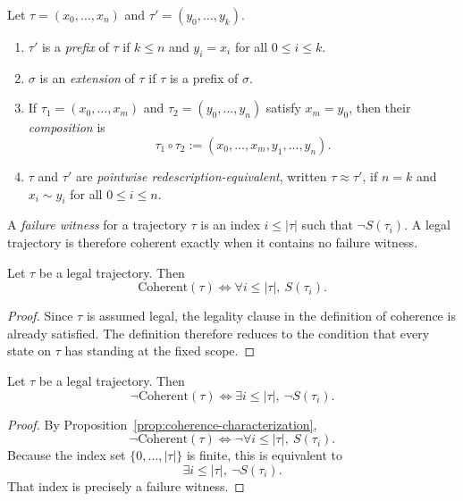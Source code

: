 \begin{definition}
Let $\tau=(x_0,\dots,x_n)$ and $\tau'=(y_0,\dots,y_k)$.
\begin{enumerate}
  \item $\tau'$ is a \emph{prefix} of $\tau$ if $k\le n$ and $y_i=x_i$ for all $0\le i\le k$.
  \item $\sigma$ is an \emph{extension} of $\tau$ if $\tau$ is a prefix of $\sigma$.
  \item If $\tau_1=(x_0,\dots,x_m)$ and $\tau_2=(y_0,\dots,y_n)$ satisfy $x_m=y_0$, then their \emph{composition} is
  \[
  \tau_1\circ \tau_2 := (x_0,\dots,x_m,y_1,\dots,y_n).
  \]
  \item $\tau$ and $\tau'$ are \emph{pointwise redescription-equivalent}, written $\tau \approx \tau'$, if $n=k$ and $x_i \sim y_i$ for all $0\le i\le n$.
\end{enumerate}
\end{definition}

\begin{definition}
A \emph{failure witness} for a trajectory $\tau$ is an index $i \le |\tau|$ such that $\neg S(\tau_i)$. A legal trajectory is therefore coherent exactly when it contains no failure witness.
\end{definition}

\begin{proposition}
\label{prop:coherence-characterization}
Let $\tau$ be a legal trajectory. Then
\[
\mathrm{Coherent}(\tau) \iff \forall i\le |\tau|,\ S(\tau_i).
\]
\end{proposition}

\begin{proof}
Since $\tau$ is assumed legal, the legality clause in the definition of coherence is already satisfied. The definition therefore reduces to the condition that every state on $\tau$ has standing at the fixed scope.\cite{MaleyTrajectory}
\end{proof}

\begin{proposition}
\label{prop:failure-witness-characterization}
Let $\tau$ be a legal trajectory. Then
\[
\neg\mathrm{Coherent}(\tau) \iff \exists i\le |\tau|,\ \neg S(\tau_i).
\]
\end{proposition}

\begin{proof}
By Proposition~\ref{prop:coherence-characterization},
\[
\neg\mathrm{Coherent}(\tau) \iff \neg\forall i\le |\tau|,\ S(\tau_i).
\]
Because the index set $\{0,\dots,|\tau|\}$ is finite, this is equivalent to
\[
\exists i\le |\tau|,\ \neg S(\tau_i).
\]
That index is precisely a failure witness.\cite{MaleyTrajectory}
\end{proof}

